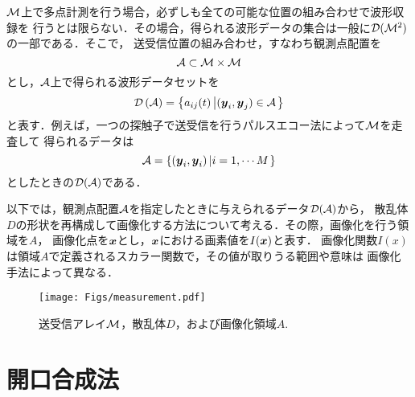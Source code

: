 $\cal M$上で多点計測を行う場合，必ずしも全ての可能な位置の組み合わせで波形収録を
行うとは限らない．その場合，得られる波形データの集合は一般に${\cal D}({\cal M}^2)$の一部である．そこで，
送受信位置の組み合わせ，すなわち観測点配置を
\begin{equation}
	{\cal A}\subset {\cal M}\times {\cal M}
	\label{eqn:XXX_apt}
\end{equation}
とし，${\cal A}$上で得られる波形データセットを
\begin{equation}
	{\cal D}\left({\cal A} \right) 
	= 
	\left\{ a_{ij}(t) \left| (\mbox{\boldmath $y$}_i,\mbox{\boldmath $y$}_j)  \in {\cal A}\right.\right\}
	\label{eqn:XXX_DA}
\end{equation}
と表す．例えば，一つの探触子で送受信を行うパルスエコー法によって$\cal M$を走査して
得られるデータは
\begin{equation}
	{\cal A}=\left\{ 
	(\mbox{\boldmath $y$}_i,\mbox{\boldmath $y$}_i)
	\left|
		i=1,\cdots M
	\right.
	\right\}
	\label{eqn:XXX_pecho}
\end{equation}
としたときの${\cal D}({\cal A})$である．

以下では，観測点配置$\cal A$を指定したときに与えられるデータ${\cal D}({\cal A})$から，
散乱体$D$の形状を再構成して画像化する方法について考える．その際，画像化を行う領域を$A$，
画像化点を$\mbox{\boldmath $x$}$とし，$\mbox{\boldmath $x$}$における画素値を$I(\mbox{\boldmath $x$})$と表す．
画像化関数$I(x)$は領域$A$で定義されるスカラー関数で，その値が取りうる範囲や意味は
画像化手法によって異なる．
\begin{figure}[h]
	\begin{center}
	\texttt{[image: Figs/measurement.pdf]} 
	\end{center}
	\caption{送受信アレイ$\cal M$，散乱体$D$，および画像化領域$A$.} 
	\label{fig:XXX_arrayM}
\end{figure}
%
\section{開口合成法}
